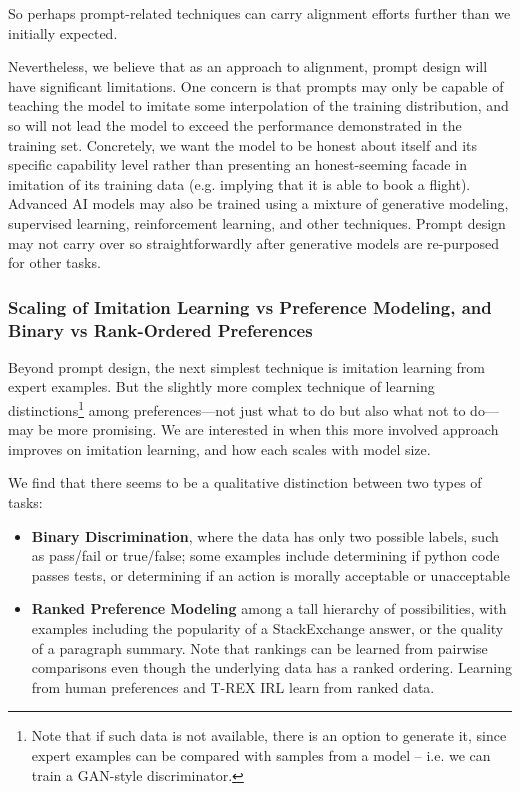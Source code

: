 So perhaps prompt-related techniques can carry alignment efforts further than we initially expected.  

Nevertheless, we believe that as an approach to alignment, prompt design will have significant limitations.  One concern is that prompts may only be capable of teaching the model to imitate some interpolation of the training distribution, and so will not lead the model to exceed the performance demonstrated in the training set. Concretely, we want the model to be honest about itself and its specific capability level rather than presenting an honest-seeming facade in imitation of its training data (e.g. implying that it is able to book a flight). Advanced AI models may also be trained using a mixture of generative modeling, supervised learning, reinforcement learning, and other techniques.  Prompt design may not carry over so straightforwardly after generative models are re-purposed for other tasks.

\subsubsection*{Scaling of Imitation Learning vs Preference Modeling, and Binary vs Rank-Ordered Preferences}

Beyond prompt design, the next simplest technique is imitation learning from expert examples.  But the slightly more complex technique of learning distinctions\footnote{Note that if such data is not available, there is an option to generate it, since expert examples can be compared with samples from a model -- i.e. we can train a GAN-style discriminator. } among preferences---not just what to do but also what not to do---may be more promising.   We are interested in when this more involved approach improves  on imitation learning, and how each scales with model size.  

We find that there seems to be a qualitative distinction between two types of tasks:

\begin{itemize}
    \item{\bf Binary Discrimination}, where the data has only two possible labels, such as pass/fail or true/false; some examples include determining if python code passes  tests, or determining if an action is morally acceptable or unacceptable \item {\bf Ranked Preference Modeling} among a tall hierarchy of possibilities, with examples including the popularity of a StackExchange answer, or the quality of a paragraph summary. Note that rankings can be learned from pairwise comparisons even though the underlying data has a ranked ordering.  Learning from human preferences \cite{christiano2017deep} and T-REX IRL \cite{brown2019extrapolating} learn from ranked data.
\end{itemize}

